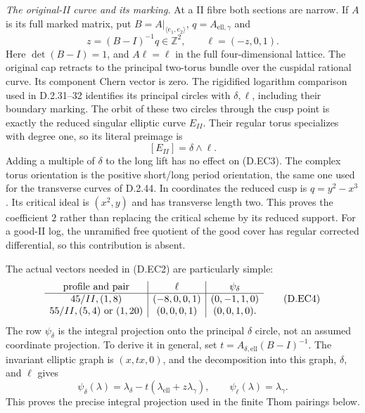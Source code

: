 \emph{The original-II curve and its marking.}
At a II fibre both sections are narrow. If $A$ is its
full marked matrix, put $B=A|_{\langle e_1,e_2\rangle}$,
$q=A_{\mathrm{ell},\gamma}$ and
\[
 z=(B-I)^{-1}q\in\mathbb Z^2,\qquad
                         \ell=(-z,0,1).
                                                               \tag{D.EC2}
\]
Here $\det(B-I)=1$, and $A\ell=\ell$ in the full
four-dimensional lattice. The original cap retracts
to the principal two-torus bundle over the cuspidal
rational curve. Its component Chern vector is zero.
The rigidified logarithm comparison used in D.2.31--32
identifies its principal circles with $\delta,\ell$,
including their boundary marking. The orbit of these
two circles through the cusp point is exactly the
reduced singular elliptic curve $E_{II}$. Their regular
torus specializes with degree one, so its literal
preimage is
\[
                             [E_{II}]=\delta\wedge\ell.
                                                               \tag{D.EC3}
\]
Adding a multiple of $\delta$ to the long lift has no
effect on (D.EC3). The complex torus orientation is
the positive short/long period orientation, the same
one used for the transverse curves of D.2.44.
In coordinates the reduced cusp is $q=y^2-x^3$.
Its critical ideal is $(x^2,y)$ and has transverse
length two. This proves the coefficient $2$ rather
than replacing the critical scheme by its reduced
support. For a good-II log, the unramified free
quotient of the good cover has regular corrected
differential, so this contribution is absent.

The actual vectors needed in (D.EC2) are particularly
simple:
\[
\begin{array}{c|c|c}
\hbox{profile and pair}&\ell&\psi_\delta\\\hline
45/II, (1,8)&(-8,0,0,1)&(0,-1,1,0)\\
55/II, (5,4)\text{ or }(1,20)&(0,0,0,1)&(0,0,1,0).
\end{array}                                                   \tag{D.EC4}
\]
The row $\psi_\delta$ is the integral projection onto
the principal $\delta$ circle, not an assumed coordinate
projection. To derive it in general, set
$t=A_{\delta,\mathrm{ell}}(B-I)^{-1}$. The invariant
elliptic graph is $(x,t x,0)$, and the decomposition
into this graph, $\delta$, and $\ell$ gives
\[
 \psi_\delta(\lambda)=\lambda_\delta-
                  t(\lambda_{\mathrm{ell}}+z\lambda_\gamma),
 \qquad \psi_\ell(\lambda)=\lambda_\gamma.
                                                               \tag{D.EC5}
\]
This proves the precise integral projection used in
the finite Thom pairings below.

